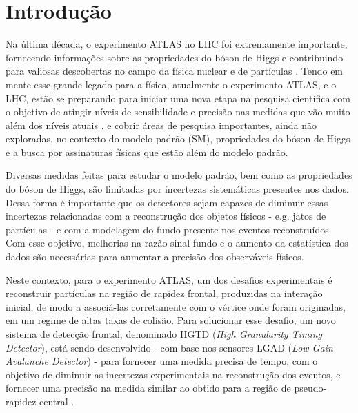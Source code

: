 \chapter{Introdução}

Na última década, o experimento ATLAS no LHC foi extremamente importante, fornecendo informações sobre as propriedades do bóson de Higgs e contribuindo para valiosas descobertas no campo da física nuclear e de partículas \cite{atlas_rev}. Tendo em mente esse grande legado para a física, atualmente o experimento ATLAS, e o LHC, estão se preparando para iniciar uma nova etapa na pesquisa científica com o objetivo de atingir níveis de sensibilidade e precisão nas medidas que vão muito além dos níveis atuais \cite{tdr}, e cobrir áreas de pesquisa importantes, ainda não exploradas, no contexto do modelo padrão (SM), propriedades do bóson de Higgs e a busca por assinaturas físicas que estão além do modelo padrão.

Diversas medidas feitas para estudar o modelo padrão, bem como as propriedades do bóson de Higgs, são limitadas por incertezas sistemáticas presentes nos dados. Dessa forma é importante que os detectores sejam capazes de diminuir essas incertezas relacionadas com a reconstrução dos objetos físicos - e.g. jatos de partículas - e com a modelagem do fundo presente nos eventos reconstruídos. Com esse objetivo, melhorias na razão sinal-fundo e o aumento da estatística dos dados são necessárias para aumentar a precisão dos observáveis físicos. %

Neste contexto, para o experimento ATLAS, um dos desafios experimentais é reconstruir partículas na região de rapidez frontal, produzidas na interação inicial, de modo a associá-las corretamente com o vértice onde foram originadas, em um regime de altas taxas de colisão. Para solucionar esse desafio, um novo sistema de detecção frontal, denominado HGTD ({\it High Granularity Timing Detector}), está sendo desenvolvido - com base nos sensores LGAD ({\it Low Gain Avalanche Detector}) - para fornecer uma medida precisa de tempo, com o objetivo de diminuir as incertezas experimentais na reconstrução dos eventos, e fornecer uma precisão na medida similar ao obtido para a região de pseudo-rapidez central \cite{tdr}.

